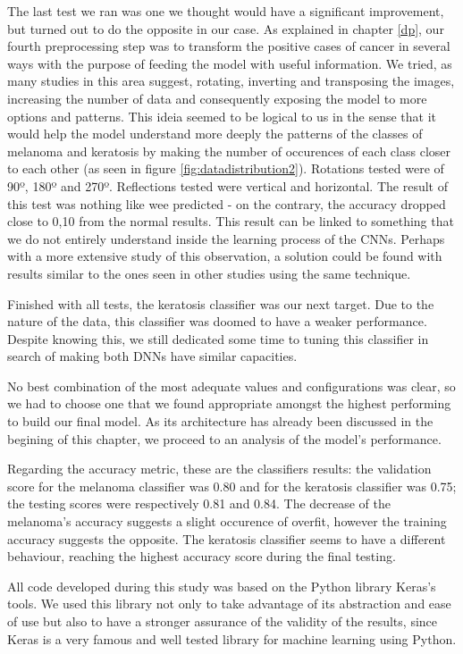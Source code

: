 \documentclass[10pt]{IEEEtran}
\begin{document}
The last test we ran was one we thought would have a significant improvement, but turned out to do the opposite in our case. 
As explained in chapter \ref{dp}, our fourth preprocessing step was to transform the positive cases of cancer in several ways with the purpose of feeding the model with useful information.
We tried, as many studies in this area suggest, rotating, inverting and transposing the images, increasing the number of data and consequently exposing the model to more options and patterns. 
This ideia seemed to be logical to us in the sense that it would help the model understand more deeply the patterns of the classes of melanoma and keratosis by making the number of occurences of each class closer to each other (as seen in figure \ref{fig:datadistribution2}).
Rotations tested were of 90º, 180º and 270º. Reflections tested were vertical and horizontal.
The result of this test was nothing like wee predicted - on the contrary, the accuracy dropped close to 0,10 from the normal results. 
This result can be linked to something that we do not entirely understand inside the learning process of the CNNs.
Perhaps with a more extensive study of this observation, a solution could be found with results similar to the ones seen in other studies using the same technique.

Finished with all tests, the keratosis classifier was our next target.
Due to the nature of the data, this classifier was doomed to have a weaker performance.
Despite knowing this, we still dedicated some time to tuning this classifier in search of making both DNNs have similar capacities.
\newline{}

No best combination of the most adequate values and configurations was clear, so we had to choose one that we found appropriate amongst the highest performing to build our final model.
As its architecture has already been discussed in the begining of this chapter, we proceed to an analysis of the model's performance.

Regarding the accuracy metric, these are the classifiers results: the validation score for the melanoma classifier was 0.80 and for the keratosis classifier was 0.75; the testing scores were respectively 0.81 and 0.84.
The decrease of the melanoma's accuracy suggests a slight occurence of overfit, however the training accuracy suggests the opposite.
The keratosis classifier seems to have a different behaviour, reaching the highest accuracy score during the final testing.

All code developed during this study was based on the Python library Keras's tools.
We used this library not only to take advantage of its abstraction and ease of use but also to have a stronger assurance of the validity of the results, since Keras is a very famous and well tested library for machine learning using Python.
\end{document}
